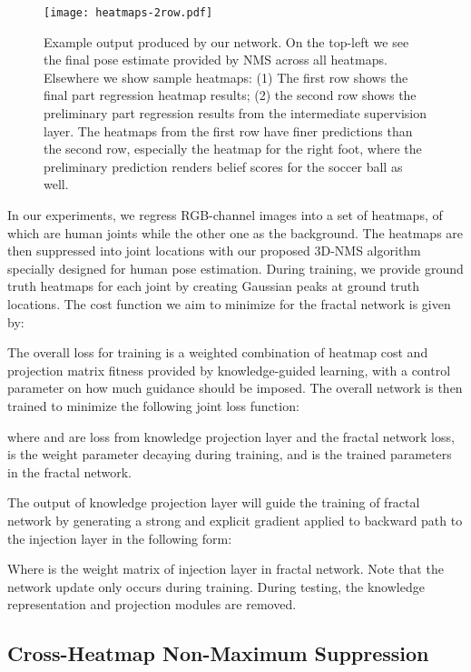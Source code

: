 \documentclass[journal ]{IEEEtran}
\begin{document}
\begin{figure*}[t]
	\begin{center}
		\texttt{[image: heatmaps-2row.pdf]}
	\end{center}
	\caption{Example output produced by our network. On the top-left we see the final pose estimate provided by NMS across all heatmaps. Elsewhere we show sample heatmaps: (1) The first row shows the final part regression heatmap results; (2) the second row shows the preliminary part regression results from the intermediate supervision layer. The heatmaps from the first row have finer predictions than the second row, especially the heatmap for the right foot, where the preliminary prediction renders belief scores for the soccer ball as well. }
	\label{fig:heatmaps}
\end{figure*}

In our experiments, we regress RGB-channel images into a set of  heatmaps,  of which are human joints while the other one as the background. The heatmaps are then suppressed into joint locations  with our proposed 3D-NMS algorithm specially designed for human pose estimation.
During training, we provide ground truth heatmaps for each joint by creating Gaussian peaks at ground truth locations. The cost function  we aim to minimize for the fractal network is given by:



The overall loss for training is a weighted combination of heatmap cost and projection matrix fitness provided by knowledge-guided learning, with a control parameter on how much guidance should be imposed. 
The overall network is then trained to minimize the following joint loss function:

where  and  are loss from knowledge projection layer and the fractal network loss,  is the weight parameter decaying during training, and  is the trained parameters in the fractal network.


The output of knowledge projection layer will guide the training of fractal network by generating a strong and explicit gradient applied to backward path to the injection layer in the following form:

Where  is the weight matrix of injection layer in fractal network.
Note that the network update only occurs during training. During testing, the knowledge representation and projection modules are removed. 


\subsection{Cross-Heatmap Non-Maximum Suppression}
\end{document}
